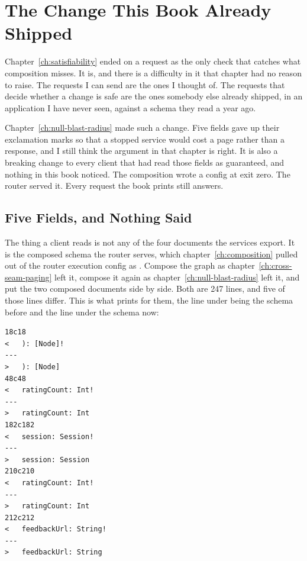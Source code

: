 \section{The Change This Book Already Shipped}
\label{sec:ch16-the-change-this-book-already-shipped}

%
Chapter~\ref{ch:satisfiability} ended on a request as the only check that
catches what composition misses. It is, and there is a difficulty in it that
chapter had no reason to raise. The requests I can send are the ones I thought
of. The requests that decide whether a change is safe are the ones somebody
else already shipped, in an application I have never seen, against a schema
they read a year ago.

%
Chapter~\ref{ch:null-blast-radius} made such a change. Five fields gave up
their exclamation marks so that a stopped service would cost a page rather
than a response, and I still think the argument in that chapter is right. It is
also a breaking change to every client that had read those fields as
guaranteed, and nothing in this book noticed. The composition wrote a config at
exit zero. The router served it. Every request the book prints still answers.

\subsection{Five Fields, and Nothing Said}

%
The thing a client reads is not any of the four documents the services export.
It is the composed schema the router serves, which
chapter~\ref{ch:composition} pulled out of the router execution config as
. Compose the graph as
chapter~\ref{ch:cross-seam-paging} left it, compose it again as
chapter~\ref{ch:null-blast-radius} left it, and put the two composed documents
side by side. Both are 247 lines, and five of those lines differ. This is what
 prints for them, the line under \code{<} being the schema before
and the line under \code{>} the schema now:

\begin{verbatim}
18c18
<   ): [Node]!
---
>   ): [Node]
48c48
<   ratingCount: Int!
---
>   ratingCount: Int
182c182
<   session: Session!
---
>   session: Session
210c210
<   ratingCount: Int!
---
>   ratingCount: Int
212c212
<   feedbackUrl: String!
---
>   feedbackUrl: String
\end{verbatim}

